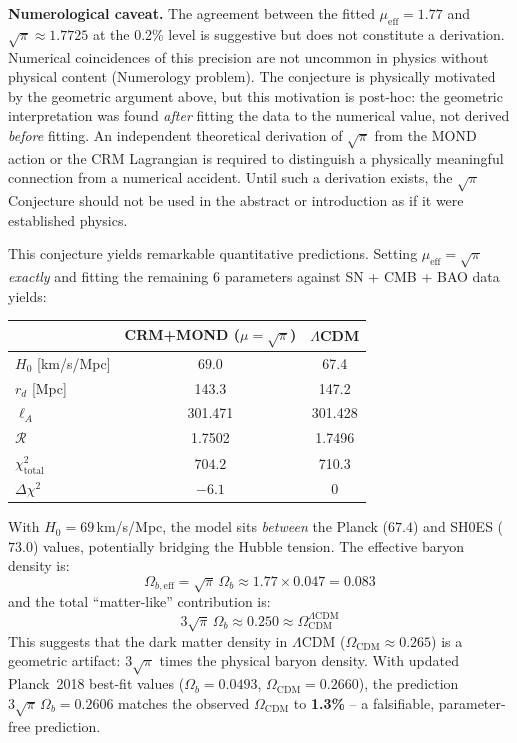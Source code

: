 \documentclass[aps,prd,twocolumn,superscriptaddress,nofootinbib]{revtex4-2}
\begin{document}
\textbf{Numerological caveat.} The agreement between the fitted $\mu_{\mathrm{eff}} = 1.77$ and $\sqrt{\pi} \approx 1.7725$ at the 0.2\% level is suggestive but does not constitute a derivation. Numerical coincidences of this precision are not uncommon in physics without physical content (Numerology problem). The conjecture is physically motivated by the geometric argument above, but this motivation is post-hoc: the geometric interpretation was found \emph{after} fitting the data to the numerical value, not derived \emph{before} fitting. An independent theoretical derivation of $\sqrt{\pi}$ from the MOND action or the CRM Lagrangian is required to distinguish a physically meaningful connection from a numerical accident. Until such a derivation exists, the $\sqrt{\pi}$ Conjecture should not be used in the abstract or introduction as if it were established physics.

This conjecture yields remarkable quantitative predictions. Setting $\mu_{\mathrm{eff}} = \sqrt{\pi}$ \textit{exactly} and fitting the remaining 6 parameters against SN + CMB + BAO data yields:
\begin{center}
\begin{tabular}{lcc}
\toprule
& CRM+MOND ($\mu = \sqrt{\pi}$) & $\Lambda$CDM \\
\midrule
$H_0$ [km/s/Mpc] & $\mathbf{69.0}$ & 67.4 \\
$r_d$ [Mpc] & 143.3 & 147.2 \\
$\ell_A$ & 301.471 & 301.428 \\
$\mathcal{R}$ & 1.7502 & 1.7496 \\
$\chi^2_{\mathrm{total}}$ & $\mathbf{704.2}$ & 710.3 \\
$\Delta\chi^2$ & $\mathbf{-6.1}$ & 0 \\
\bottomrule
\end{tabular}
\end{center}
With $H_0 = 69$\,km/s/Mpc, the model sits \textit{between} the Planck ($67.4$) and SH0ES ($73.0$) values, potentially bridging the Hubble tension. The effective baryon density is:
\begin{equation}
\Omega_{b,\mathrm{eff}} = \sqrt{\pi}\,\Omega_b \approx 1.77 \times 0.047 = 0.083
\end{equation}
and the total ``matter-like'' contribution is:
\begin{equation}
3\sqrt{\pi}\,\Omega_b \approx 0.250 \approx \Omega_{\mathrm{CDM}}^{\Lambda\mathrm{CDM}}
\end{equation}
This suggests that the dark matter density in $\Lambda$CDM ($\Omega_{\mathrm{CDM}} \approx 0.265$) is a geometric artifact: $3\sqrt{\pi}$ times the physical baryon density. With updated Planck~2018 best-fit values ($\Omega_b = 0.0493$, $\Omega_{\mathrm{CDM}} = 0.2660$), the prediction $3\sqrt{\pi}\,\Omega_b = 0.2606$ matches the observed $\Omega_{\mathrm{CDM}}$ to \textbf{1.3\%} -- a falsifiable, parameter-free prediction.
\end{document}
